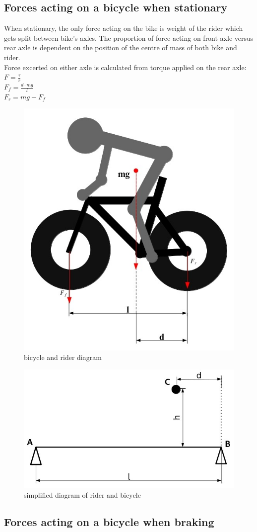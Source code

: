 \documentclass[12pt]{article}
\begin{document}
\subsection{Forces acting on a bicycle when stationary}
When stationary, the only force acting on the bike is weight of the rider which gets split between bike's axles.
The proportion of force acting on front axle versus rear axle is dependent on the position of the centre of mass
of both bike and rider. \\
Force excerted on either axle is calculated from torque applied on the rear axle: \\
$F = \frac{\tau}{r}$\\
$F_f = \frac{d \cdot mg}{l}$\\
$F_r = mg - F_f$
\begin{figure}[h]
\centering
\includegraphics[width = 0.65 \linewidth]{static_with_forces_bike}
\caption{bicycle and rider diagram}
\end{figure}
\begin{figure}[h]
\centering
\includegraphics[width = 0.45 \linewidth]{bike_static_model_simplified}
\caption{simplified diagram of rider and bicycle}
\end{figure}

\subsection{Forces acting on a bicycle when braking}
\end{document}
